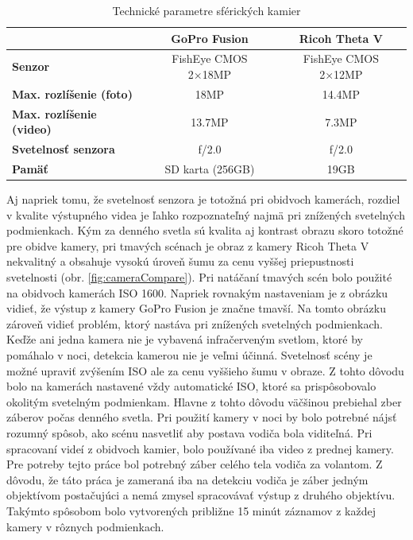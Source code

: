 \documentclass[slovak,master,dept460,male,cpp,cpdeclaration]{diploma}
\begin{document}
\begin{table}[H]
\begin{tabular}{|l|c|c|}
\hline
                                     & \textbf{GoPro Fusion}  & \textbf{Ricoh Theta V} \\ \hline
\textbf{Senzor}                      & FishEye CMOS 2×18MP    & FishEye CMOS 2×12MP    \\ \hline
\textbf{Max. rozlíšenie (foto)}      & 18MP                   & 14.4MP                 \\ \hline
\textbf{Max. rozlíšenie (video)}     & 13.7MP                 & 7.3MP                  \\ \hline
\textbf{Svetelnosť senzora}          &  f/2.0                 & f/2.0                  \\ \hline
\textbf{Pamäť}                       &  SD karta (256GB)      & 19GB                   \\ \hline
\end{tabular}
	\caption{Technické parametre sférických kamier}
	\label{tab:techSpec}
\end{table}
\newpage
Aj napriek tomu, že svetelnosť senzora je totožná pri obidvoch kamerách, rozdiel v kvalite výstupného videa je ľahko rozpoznateľný najmä pri znížených svetelných podmienkach. Kým za denného svetla sú kvalita aj kontrast obrazu skoro totožné pre obidve kamery, pri tmavých scénach je obraz z kamery Ricoh Theta V nekvalitný a obsahuje vysokú úroveň šumu za cenu vyššej priepustnosti svetelnosti (obr. \ref{fig:cameraCompare}). Pri natáčaní tmavých scén bolo použité na obidvoch kamerách ISO 1600. Napriek rovnakým nastaveniam je z obrázku vidieť, že výstup z kamery GoPro Fusion je značne tmavší. Na tomto obrázku zároveň vidieť problém, ktorý nastáva  pri znížených svetelných podmienkach. Keďže ani jedna kamera nie je vybavená infračerveným svetlom, ktoré by pomáhalo v noci, detekcia kamerou  nie je veľmi účinná. Svetelnosť scény je možné upraviť zvýšením ISO ale za cenu vyššieho šumu v obraze. Z tohto dôvodu bolo na kamerách nastavené vždy automatické ISO, ktoré sa prispôsobovalo okolitým svetelným podmienkam. Hlavne z tohto dôvodu väčšinou prebiehal zber záberov počas denného svetla. Pri  použití kamery v noci by bolo potrebné nájsť rozumný spôsob, ako scénu nasvetliť aby postava vodiča bola viditeľná. Pri spracovaní videí z obidvoch kamier, bolo používané iba video z prednej kamery. Pre potreby tejto práce bol potrebný záber celého tela vodiča za volantom. Z dôvodu, že táto práca je zameraná iba na detekciu vodiča je záber jedným objektívom postačujúci a nemá zmysel spracovávať výstup z druhého objektívu. Takýmto spôsobom bolo vytvorených približne 15 minút záznamov z každej kamery v rôznych podmienkach.
\end{document}
